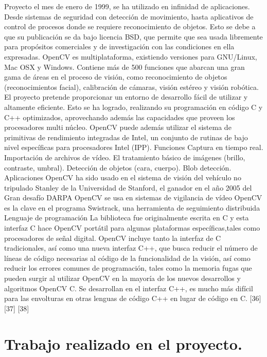 \documentclass[12pt]{article}
\begin{document}
Proyecto
el mes de enero de 1999, se ha utilizado en infinidad de aplicaciones. Desde sistemas de seguridad con detección de movimiento, hasta aplicativos de control de procesos donde se requiere reconocimiento de objetos. Esto se debe a que su publicación se da bajo licencia BSD, que permite que sea usada libremente para propósitos comerciales y de investigación con las condiciones en ella expresadas.
OpenCV es multiplataforma, existiendo versiones para GNU/Linux, Mac OSX y Windows. Contiene más de 500 funciones que abarcan una gran gama de áreas en el proceso de visión, como reconocimiento de objetos (reconocimientos facial), calibración de cámaras, visión estéreo y visión robótica.
El proyecto pretende proporcionar un entorno de desarrollo fácil de utilizar y altamente eficiente. Esto se ha logrado, realizando su programación en código C y C++ optimizados, aprovechando además las capacidades que proveen los procesadores multi núcleo. OpenCV puede además utilizar el sistema de primitivas de rendimiento integradas de Intel, un conjunto de rutinas de bajo nivel específicas para procesadores Intel (IPP).
Funciones
Captura en tiempo real.
Importación de archivos de vídeo.
El tratamiento básico de imágenes (brillo, contraste, umbral).
Detección de objetos (cara, cuerpo).
Blob detección.
Aplicaciones
OpenCV ha sido usado en el sistema de visión del vehículo no tripulado Stanley de la Universidad de Stanford, el ganador en el año 2005 del Gran desafío DARPA
OpenCV se usa en sistemas de vigilancia de vídeo
OpenCV es la clave en el programa Swistrack, una herramienta de seguimiento distribuida
Lenguaje de programación
La biblioteca fue originalmente escrita en C y esta interfaz C hace OpenCV portátil para algunas plataformas específicas,tales como procesadores de señal digital.
OpenCV incluye tanto la interfaz de C tradicionales, así como una nueva interfaz C++, que busca reducir el número de líneas de código necesarias al código de la funcionalidad de la visión, así como reducir los errores comunes de programación, tales como la memoria fugas que pueden surgir al utilizar OpenCV en la mayoría de los nuevos desarrollos y algoritmos OpenCV C.
Se desarrollan en el interfaz C++, es mucho más difícil para las envolturas en otras lenguas de código C++ en lugar de código en C. [36] [37] [38]


\section{Trabajo realizado en el proyecto.}
\end{document}
